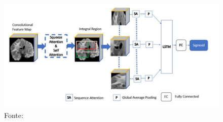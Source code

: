\begin{figure}[htbp]
    \centering
    \includegraphics[width=1\textwidth]{figures/fig010.png}
    \caption{Fonte: \cite{iranmehrImprovedPredictionMGMT2022}}
    \label{fig:fig010}
\end{figure}

